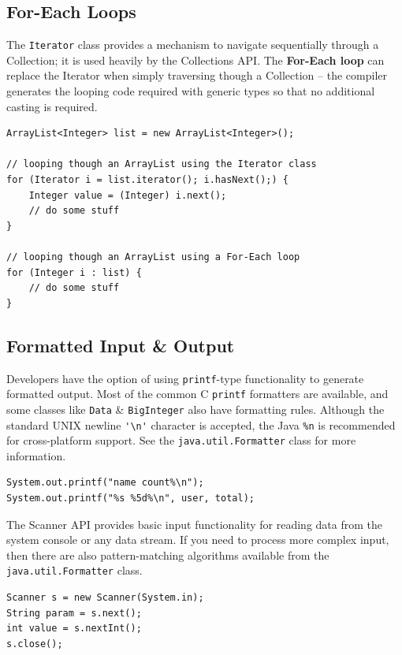 \documentclass[a4paper,11pt]{article}
\begin{document}
\subsection{For-Each Loops}
The \verb|Iterator| class provides a mechanism to navigate sequentially through a Collection; it is used heavily by the
Collections API.
The \textbf{For-Each loop} can replace the Iterator when simply traversing though a Collection -- the compiler
generates the looping code required with generic types so that no additional casting is required.
\begin{verbatim}
ArrayList<Integer> list = new ArrayList<Integer>(); 

// looping though an ArrayList using the Iterator class
for (Iterator i = list.iterator(); i.hasNext();) {
    Integer value = (Integer) i.next();
    // do some stuff
}

// looping though an ArrayList using a For-Each loop
for (Integer i : list) {
    // do some stuff
}
\end{verbatim}

\subsection{Formatted Input \& Output}
Developers have the option of using \verb|printf|-type functionality to generate formatted output. 
Most of the common C \verb|printf| formatters are available, and some classes like \verb|Data| \& \verb|BigInteger| also
have formatting rules. 
Although the standard UNIX newline \verb|'\n'| character is accepted, the Java \verb|%n| is recommended for cross-platform 
support.
See the \verb|java.util.Formatter| class for more information.
\begin{verbatim}
System.out.printf("name count%\n");
System.out.printf("%s %5d%\n", user, total);
\end{verbatim}

The Scanner API provides basic input functionality for reading data from the system console or any data stream.
If you need to process more complex input, then there are also pattern-matching algorithms available from the 
\verb|java.util.Formatter| class.
\begin{verbatim}
Scanner s = new Scanner(System.in);
String param = s.next();
int value = s.nextInt();
s.close();
\end{verbatim}
\end{document}
